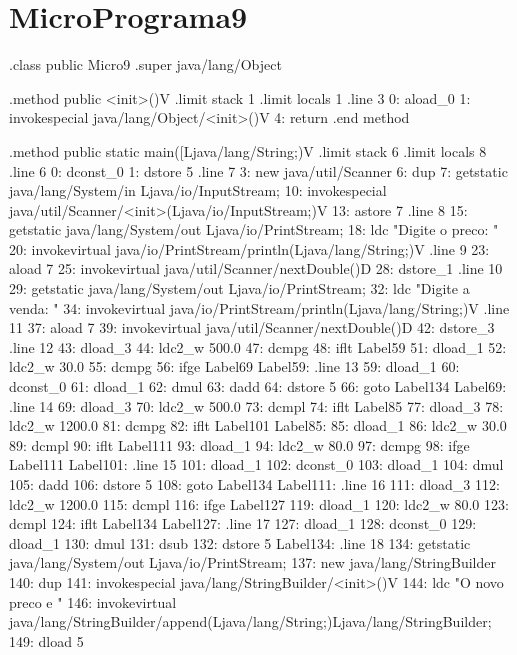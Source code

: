 \documentclass[12pt,a4paper,twoside]{report}
\begin{document}
\section{MicroPrograma9}
\begin{terminal}
.class public Micro9
.super java/lang/Object

.method public <init>()V
  .limit stack 1
  .limit locals 1
  .line 3
  0: aload_0
  1: invokespecial java/lang/Object/<init>()V
  4: return
.end method

.method public static main([Ljava/lang/String;)V
  .limit stack 6
  .limit locals 8
  .line 6
  0: dconst_0
  1: dstore 5
  .line 7
  3: new java/util/Scanner
  6: dup
  7: getstatic java/lang/System/in Ljava/io/InputStream;
  10: invokespecial java/util/Scanner/<init>(Ljava/io/InputStream;)V
  13: astore 7
  .line 8
  15: getstatic java/lang/System/out Ljava/io/PrintStream;
  18: ldc "Digite o preco: "
  20: invokevirtual java/io/PrintStream/println(Ljava/lang/String;)V
  .line 9
  23: aload 7
  25: invokevirtual java/util/Scanner/nextDouble()D
  28: dstore_1
  .line 10
  29: getstatic java/lang/System/out Ljava/io/PrintStream;
  32: ldc "Digite a venda: "
  34: invokevirtual java/io/PrintStream/println(Ljava/lang/String;)V
  .line 11
  37: aload 7
  39: invokevirtual java/util/Scanner/nextDouble()D
  42: dstore_3
  .line 12
  43: dload_3
  44: ldc2_w 500.0
  47: dcmpg
  48: iflt Label59
  51: dload_1
  52: ldc2_w 30.0
  55: dcmpg
  56: ifge Label69
Label59:
  .line 13
  59: dload_1
  60: dconst_0
  61: dload_1
  62: dmul
  63: dadd
  64: dstore 5
  66: goto Label134
Label69:
  .line 14
  69: dload_3
  70: ldc2_w 500.0
  73: dcmpl
  74: iflt Label85
  77: dload_3
  78: ldc2_w 1200.0
  81: dcmpg
  82: iflt Label101
Label85:
  85: dload_1
  86: ldc2_w 30.0
  89: dcmpl
  90: iflt Label111
  93: dload_1
  94: ldc2_w 80.0
  97: dcmpg
  98: ifge Label111
Label101:
  .line 15
  101: dload_1
  102: dconst_0
  103: dload_1
  104: dmul
  105: dadd
  106: dstore 5
  108: goto Label134
Label111:
  .line 16
  111: dload_3
  112: ldc2_w 1200.0
  115: dcmpl
  116: ifge Label127
  119: dload_1
  120: ldc2_w 80.0
  123: dcmpl
  124: iflt Label134
Label127:
  .line 17
  127: dload_1
  128: dconst_0
  129: dload_1
  130: dmul
  131: dsub
  132: dstore 5
Label134:
  .line 18
  134: getstatic java/lang/System/out Ljava/io/PrintStream;
  137: new java/lang/StringBuilder
  140: dup
  141: invokespecial java/lang/StringBuilder/<init>()V
  144: ldc "O novo preco e "
  146: invokevirtual java/lang/StringBuilder/append(Ljava/lang/String;)Ljava/lang/StringBuilder;
  149: dload 5

\end{terminal}
\end{document}
